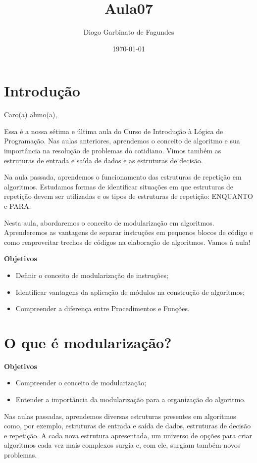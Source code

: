 \documentclass[11pt]{article}
\author{Diogo Garbinato de Fagundes}
\date{\today}
\title{Aula07}
\begin{document}
\maketitle
\tableofcontents


\section{Introdução}
\label{sec:org73b4e7b}

Caro(a) aluno(a),

Essa é a nossa sétima e última aula do Curso de Introdução à Lógica de Programação. Nas aulas anteriores, aprendemos o conceito de algoritmo e sua importância na resolução de problemas do cotidiano. Vimos também as estruturas de entrada e saída de dados e as estruturas de decisão.

Na aula passada, aprendemos o funcionamento das estruturas de repetição em algoritmos. Estudamos formas de identificar situações em que estruturas de repetição devem ser utilizadas e os tipos de estruturas de repetição: ENQUANTO e PARA.

Nesta aula, abordaremos o conceito de modularização em algoritmos. Aprenderemos as vantagens de separar instruções em pequenos blocos de código e como reaproveitar trechos de códigos na elaboração de algoritmos. Vamos à aula!

\textbf{Objetivos}
\begin{itemize}
\item Definir o conceito de modularização de instruções;
\item Identificar vantagens da aplicação de módulos na construção de algoritmos;
\item Compreender a diferença entre Procedimentos e Funções.
\end{itemize}

\section{O que é modularização?}
\label{sec:org46bb898}

\textbf{Objetivos}
\begin{itemize}
\item Compreender o conceito de modularização;
\item Entender a importância da modularização para a organização do algoritmo.
\end{itemize}

Nas aulas passadas, aprendemos diversas estruturas presentes em algoritmos como, por exemplo, estruturas de entrada e saída de dados, estruturas de decisão e repetição. A cada nova estrutura apresentada, um universo de opções para criar algoritmos cada vez mais complexos surgia e, com ele, surgiam também novos problemas.
\end{document}
